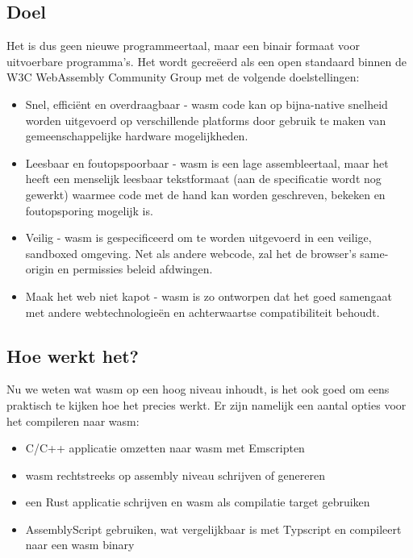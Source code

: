 \subsection{Doel}

Het is dus geen nieuwe programmeertaal, maar een binair formaat voor uitvoerbare programma’s. Het
wordt gecreëerd als een open standaard binnen de W3C WebAssembly Community Group met de volgende
doelstellingen: 
\begin{itemize}
  \item Snel, efficiënt en overdraagbaar - wasm code kan op bijna-native snelheid worden uitgevoerd
    op verschillende platforms door gebruik te maken van gemeenschappelijke hardware mogelijkheden. 

  \item Leesbaar en foutopspoorbaar - wasm is een lage assembleertaal, maar het heeft een menselijk
    leesbaar tekstformaat (aan de specificatie wordt nog gewerkt) waarmee code met de hand kan
    worden geschreven, bekeken en foutopsporing mogelijk is. 

  \item Veilig - wasm is gespecificeerd om te worden uitgevoerd in een veilige, sandboxed omgeving.
    Net als andere webcode, zal het de browser's same-origin en permissies beleid afdwingen. 

  \item Maak het web niet kapot - wasm is zo ontworpen dat het goed samengaat met andere
    webtechnologieën en achterwaartse compatibiliteit behoudt.
\end{itemize}

\subsection{Hoe werkt het?}

Nu we weten wat wasm op een hoog niveau inhoudt, is het ook goed om eens praktisch te kijken hoe het
precies werkt. Er zijn namelijk een aantal opties voor het compileren naar wasm: 

\begin{itemize}
  \item C/C++ applicatie omzetten naar wasm met Emscripten 

  \item wasm rechtstreeks op assembly niveau schrijven of genereren 

  \item een Rust applicatie schrijven en wasm als compilatie target gebruiken 

  \item AssemblyScript gebruiken, wat vergelijkbaar is met Typscript en compileert naar een wasm
    binary 
\end{itemize}

